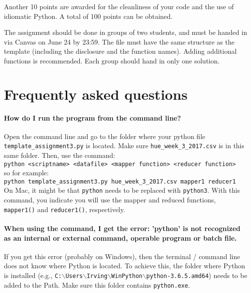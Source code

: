 \documentclass[a4paper]{report}
\theoremstyle{definition}
\begin{document}
	\noindent Another 10 points are awarded for the cleanliness of your code and the use of idiomatic Python. A total of 100 points can be obtained.
	
	The assignment should be done in groups of two students, and must be handed in via Canvas on June 24 by 23:59. The file must have the same structure as the template (including the disclosure and the function names). Adding additional functions is recommended. Each group should hand in only one solution.


\section*{Frequently asked questions}

\paragraph{How do I run the program from the command line?}
Open the command line and go to the folder where your python file \texttt{template\_assignment3.py} is located. Make sure \texttt{hue\_week\_3\_2017.csv} is in this same folder. Then, use the command:\\

\noindent \texttt{python <scriptname> <datafile> <mapper function> <reducer function>}\\

\noindent so for example:\\

\noindent \texttt{python template\_assignment3.py hue\_week\_3\_2017.csv mapper1 reducer1}\\

\noindent On Mac, it might be that \texttt{python} needs to be replaced with \texttt{python3}. With this command, you indicate you will use the mapper and reduced functions, \texttt{mapper1()} and \texttt{reducer1()}, respectively.

\paragraph{When using the command, I get the error: 'python' is not recognized as an internal or external command, operable program or batch file.}
If you get this error (probably on Windows), then the terminal / command line does not know where Python is located. To achieve this, the folder where Python is installed (e.g., \texttt{C:$\backslash{}$Users$\backslash{}$Irving$\backslash{}$WinPython$\backslash{}$python-3.6.5.amd64}) needs to be added to the Path. Make sure this folder contains \texttt{python.exe}.
\end{document}
